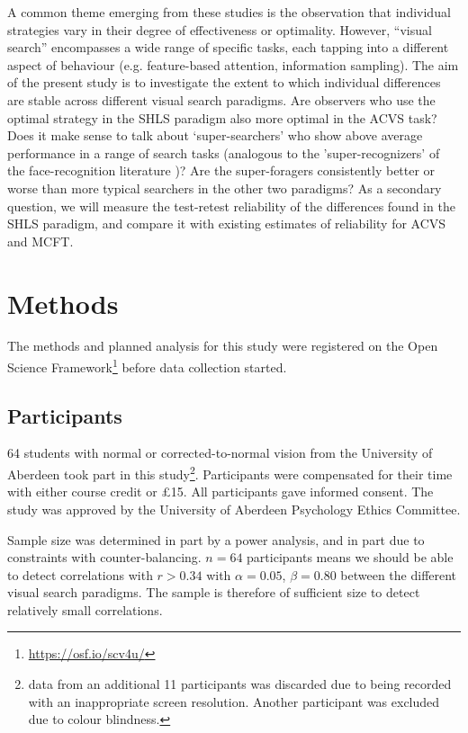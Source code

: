 \documentclass[twocolumn]{article}
\begin{document}
A common theme emerging from these studies is the observation that individual strategies vary in their degree of effectiveness or optimality. However, ``visual search'' encompasses a wide range of specific tasks, each tapping into a different aspect of behaviour (e.g. feature-based attention, information sampling). The aim of the present study is to investigate the extent to which individual differences are stable across different visual search paradigms. Are observers who use the optimal strategy in the SHLS paradigm also more optimal in the ACVS task? Does it make sense to talk about `super-searchers' who show above average performance in a range of search tasks (analogous to the 'super-recognizers' of the face-recognition literature \cite{russell2009})? Are the super-foragers consistently better or worse than more typical searchers in the other two paradigms? As a secondary question, we will measure the test-retest reliability of the differences found in the SHLS paradigm, and compare it with existing estimates of reliability for ACVS and MCFT. 

\section{Methods}

The methods and planned analysis for this study were registered on the Open Science Framework\footnote{\url{https://osf.io/scv4u/}} before data collection started.

\subsection{Participants}
64 students with normal or corrected-to-normal vision from the University of Aberdeen took part in this study\footnote{data from an additional 11 participants was discarded due to being recorded with an inappropriate screen resolution. Another participant was excluded due to colour blindness.}. Participants were compensated for their time with either  course credit or \pounds 15. All participants gave informed consent. The study was approved by the University of Aberdeen Psychology Ethics Committee. 

Sample size was determined in part by a power analysis, and in part due to constraints with counter-balancing. $n = 64$ participants means we should be able to detect correlations with $r > 0.34$ with $\alpha = 0.05$, $\beta = 0.80$ between the different visual search paradigms. The sample is therefore of sufficient size to detect relatively small correlations.
\end{document}
